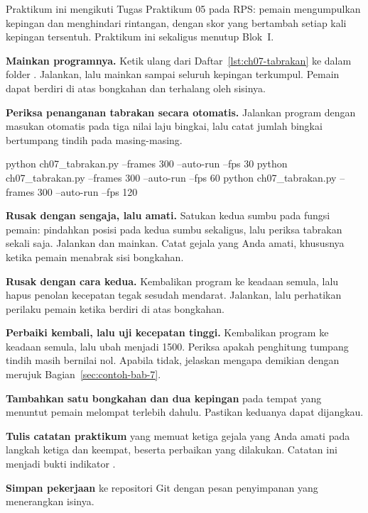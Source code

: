 \begin{praktikumbox}
Praktikum ini mengikuti Tugas Praktikum 05 pada RPS: pemain mengumpulkan
kepingan dan menghindari rintangan, dengan skor yang bertambah setiap kali
kepingan tersentuh. Praktikum ini sekaligus menutup Blok~I.

\begin{langkah}
  \item \textbf{Mainkan programnya.} Ketik ulang  dari
        Daftar~\ref{lst:ch07-tabrakan} ke dalam folder . Jalankan,
        lalu mainkan sampai seluruh kepingan terkumpul. Pemain dapat berdiri
        di atas bongkahan dan terhalang oleh sisinya.

  \item \textbf{Periksa penanganan tabrakan secara otomatis.} Jalankan program
        dengan masukan otomatis pada tiga nilai laju bingkai, lalu catat
        jumlah bingkai bertumpang tindih pada masing-masing.
\begin{kodekeluaran}
python ch07_tabrakan.py --frames 300 --auto-run --fps 30
python ch07_tabrakan.py --frames 300 --auto-run --fps 60
python ch07_tabrakan.py --frames 300 --auto-run --fps 120
\end{kodekeluaran}

  \item \textbf{Rusak dengan sengaja, lalu amati.} Satukan kedua sumbu pada
        fungsi  pemain: pindahkan posisi pada kedua sumbu
        sekaligus, lalu periksa tabrakan sekali saja. Jalankan dan mainkan.
        Catat gejala yang Anda amati, khususnya ketika pemain menabrak sisi
        bongkahan.

  \item \textbf{Rusak dengan cara kedua.} Kembalikan program ke keadaan semula,
        lalu hapus penolan kecepatan tegak sesudah mendarat. Jalankan, lalu
        perhatikan perilaku pemain ketika berdiri di atas bongkahan.

  \item \textbf{Perbaiki kembali, lalu uji kecepatan tinggi.} Kembalikan
        program ke keadaan semula, lalu ubah  menjadi 1500.
        Periksa apakah penghitung tumpang tindih masih bernilai nol. Apabila
        tidak, jelaskan mengapa demikian dengan merujuk
        Bagian~\ref{sec:contoh-bab-7}.

  \item \textbf{Tambahkan satu bongkahan dan dua kepingan} pada tempat yang
        menuntut pemain melompat terlebih dahulu. Pastikan keduanya dapat
        dijangkau.

  \item \textbf{Tulis catatan praktikum} yang memuat ketiga gejala yang Anda
        amati pada langkah ketiga dan keempat, beserta perbaikan yang
        dilakukan. Catatan ini menjadi bukti indikator .

  \item \textbf{Simpan pekerjaan} ke repositori Git dengan pesan penyimpanan
        yang menerangkan isinya.
\end{langkah}
\end{praktikumbox}

